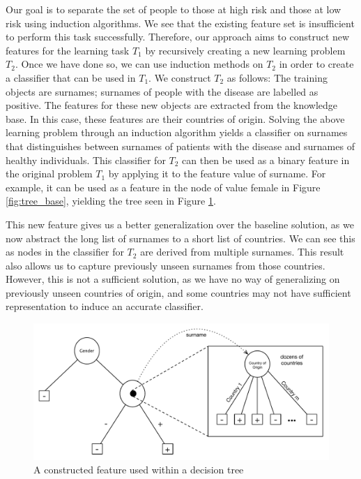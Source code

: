 \documentclass[twoside,11pt]{article}
\theoremstyle{definition}
\begin{document}
 Our goal is to separate the set of people to those at high risk and those at low risk using induction algorithms. We see that the existing feature set is insufficient to perform this task successfully. Therefore, our approach aims to construct new features for the learning task $T_1$ by recursively creating a new learning problem $T_2$. Once we have done so, we can use induction methods on $T_2$ in order to create a classifier that can be used in $T_1$. We construct $T_2$ as follows: 
  The training objects are surnames; surnames of people with the disease are labelled as positive. The features for these new objects are extracted from the knowledge base. In this case, these features are their countries of origin.
Solving the above learning problem through an induction algorithm yields a classifier on surnames that distinguishes between surnames of patients with the disease and surnames of healthy individuals. This classifier for $T_2$ can then be used as a binary feature in the original problem $T_1$ by applying it to the feature value of surname. For example, it can be used as a feature in the node of value female in Figure \ref{fig:tree_base}, yielding the tree seen in Figure \ref{fig:lvl1_tree}. 

This new feature gives us a better generalization over the baseline solution, as we now abstract the long list of surnames to a short list of countries. We can see this as nodes in the classifier for $T_2$ are derived from multiple surnames. This result also allows us to capture previously unseen surnames from those countries. However, this is not a sufficient solution, as we have no way of generalizing on previously unseen countries of origin, and some countries may not have sufficient representation to induce an accurate classifier. %


\begin{figure}
	\centering
	\includegraphics[width=\linewidth]{fig2.pdf}
	\caption{A constructed feature used within a decision tree}
	\label{fig:lvl1_tree}
\end{figure}
\end{document}
